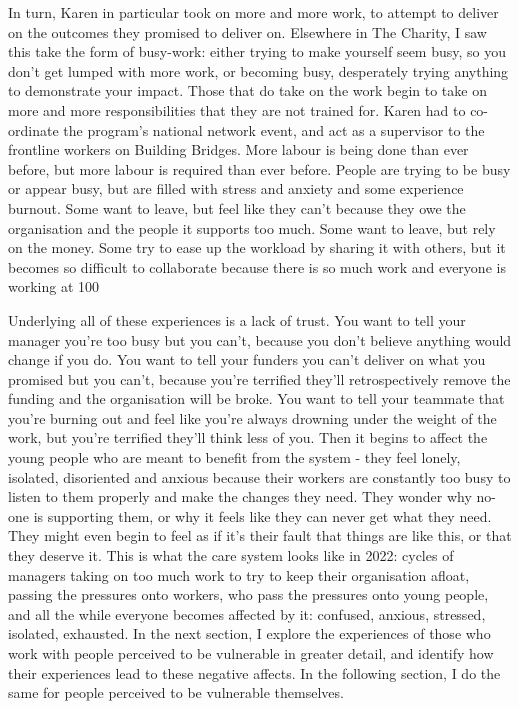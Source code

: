 In turn, Karen in particular took on more and more work, to attempt to deliver on the outcomes they promised to deliver on. Elsewhere in The Charity, I saw this take the form of busy-work: either trying to make yourself seem busy, so you don’t get lumped with more work, or becoming busy, desperately trying anything to demonstrate your impact. Those that do take on the work begin to take on more and more responsibilities that they are not trained for. Karen had to co-ordinate the program’s national network event, and act as a supervisor to the frontline workers on Building Bridges. More labour is being done than ever before, but more labour is required than ever before. People are trying to be busy or appear busy, but are filled with stress and anxiety and some experience burnout. Some want to leave, but feel like they can’t because they owe the organisation and the people it supports too much. Some want to leave, but rely on the money. Some try to ease up the workload by sharing it with others, but it becomes so difficult to collaborate because there is so much work and everyone is working at 100%

Underlying all of these experiences is a lack of trust. You want to tell your manager you’re too busy but you can’t, because you don’t believe anything would change if you do. You want to tell your funders you can’t deliver on what you promised but you can’t, because you’re terrified they’ll retrospectively remove the funding and the organisation will be broke. You want to tell your teammate that you’re burning out and feel like you’re always drowning under the weight of the work, but you’re terrified they’ll think less of you. Then it begins to affect the young people who are meant to benefit from the system - they feel lonely, isolated, disoriented and anxious because their workers are constantly too busy to listen to them properly and make the changes they need. They wonder why no-one is supporting them, or why it feels like they can never get what they need. They might even begin to feel as if it’s their fault that things are like this, or that they deserve it. This is what the care system looks like in 2022: cycles of managers taking on too much work to try to keep their organisation afloat, passing the pressures onto workers, who pass the pressures onto young people, and all the while everyone becomes affected by it: confused, anxious, stressed, isolated, exhausted. In the next section, I explore the experiences of those who work with people perceived to be vulnerable in greater detail, and identify how their experiences lead to these negative affects. In the following section, I do the same for  people perceived to be vulnerable themselves. 


